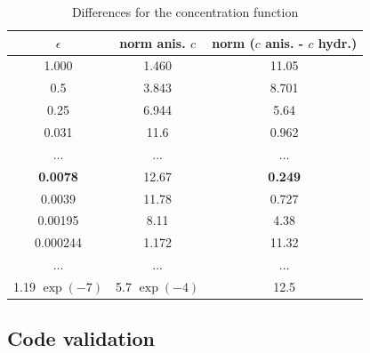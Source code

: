 \documentclass[12pt]{report}
\numberwithin{theorem}{chapter}
\numberwithin{corollary}{chapter}
\numberwithin{lemma}{chapter}
\numberwithin{remark}{chapter}
\numberwithin{definition}{chapter}
\numberwithin{prop}{chapter}
\begin{document}
\begin{table}[H]
\caption{Differences for the concentration function}
\begin{center}
\begin{tabular}{ccc}
    \hline
    $\epsilon$ & norm anis. $c$ &  norm ($c$ anis. - $c$ hydr.)\\
    \hline
    1.000 & 1.460 & 11.05 \\
    0.5 & 3.843 & 8.701 \\
    0.25 & 6.944 & 5.64 \\   
    0.031 & 11.6 & 0.962 \\
    ... & ... & ...  \\
    \textbf{0.0078} & 12.67 & \textbf{0.249} \\
    0.0039 & 11.78 & 0.727 \\
    0.00195 & 8.11 & 4.38 \\
    0.000244 & 1.172 & 11.32 \\
    ... & ... & ...  \\
    1.19 $\exp(-7)$ & 5.7 $\exp(-4)$ & 12.5 \\
    \hline
\end{tabular}
\end{center}
\end{table}

\subsection{Code validation}\label{codetestingsection}
\end{document}

